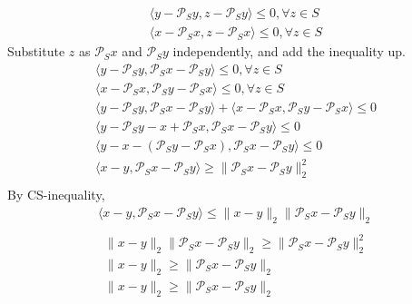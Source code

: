 \documentclass[12pt]{article}
\begin{document}
\begin{align*}
    \langle y - \mathcal{P}_S y, z - \mathcal{P}_S y\rangle \leq 0, \forall z \in S \\
    \langle x - \mathcal{P}_S x, z - \mathcal{P}_S x\rangle \leq 0, \forall z \in S
\end{align*}
Substitute \(z\) as \(\mathcal{P}_S x\) and \(\mathcal{P}_S y\) independently, and add the inequality up.
\begin{align*}
    \langle y - \mathcal{P}_S y, \mathcal{P}_S x - \mathcal{P}_S y\rangle \leq 0, \forall z \in S \\
    \langle x - \mathcal{P}_S x, \mathcal{P}_S y - \mathcal{P}_S x\rangle \leq 0, \forall z \in S \\
    \langle y - \mathcal{P}_S y, \mathcal{P}_S x - \mathcal{P}_S y\rangle + \langle x - \mathcal{P}_S x, \mathcal{P}_S y - \mathcal{P}_S x\rangle \leq 0 \\
    \langle y - \mathcal{P}_S y - x + \mathcal{P}_S x, \mathcal{P}_S x - \mathcal{P}_S y\rangle  \leq 0 \\
    \langle y - x - (\mathcal{P}_S y  - \mathcal{P}_S x), \mathcal{P}_S x - \mathcal{P}_S y\rangle  \leq 0 \\
    \langle x - y, \mathcal{P}_S x - \mathcal{P}_S y\rangle  \geq \|\mathcal{P}_S x - \mathcal{P}_S y\|_2^2 \\
\end{align*}
By CS-inequality,
\begin{align*}
    \langle x - y, \mathcal{P}_S x - \mathcal{P}_S y\rangle  \leq \|x - y\|_2 \|\mathcal{P}_S x - \mathcal{P}_S y\|_2 \\
\end{align*}
\begin{align*}
    \|x - y\|_2 \|\mathcal{P}_S x - \mathcal{P}_S y\|_2 \geq \|\mathcal{P}_S x - \mathcal{P}_S y\|_2^2 \\
    \|x - y\|_2 \geq \|\mathcal{P}_S x - \mathcal{P}_S y\|_2 \\
    \|x - y\|_2 \geq \|\mathcal{P}_S x - \mathcal{P}_S y\|_2 \\
\end{align*}
\end{document}
